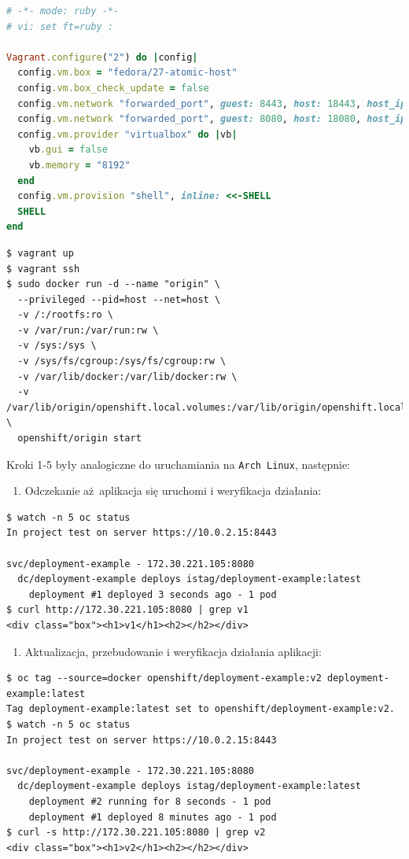 \documentclass[a4paper,12pt,twoside,openany]{report}
\providecommand{\tightlist}{%
  \setlength{\itemsep}{0pt}\setlength{\parskip}{0pt}}
\newcommand{\passthrough}[1]{#1}
\begin{document}
\begin{lstlisting}[language=Ruby]
# -*- mode: ruby -*-
# vi: set ft=ruby :

Vagrant.configure("2") do |config|
  config.vm.box = "fedora/27-atomic-host"
  config.vm.box_check_update = false
  config.vm.network "forwarded_port", guest: 8443, host: 18443, host_ip: "127.0.0.1"
  config.vm.network "forwarded_port", guest: 8080, host: 18080, host_ip: "127.0.0.1"
  config.vm.provider "virtualbox" do |vb|
    vb.gui = false
    vb.memory = "8192"
  end
  config.vm.provision "shell", inline: <<-SHELL
  SHELL
end
\end{lstlisting}

\begin{lstlisting}
$ vagrant up
$ vagrant ssh
$ sudo docker run -d --name "origin" \
  --privileged --pid=host --net=host \
  -v /:/rootfs:ro \
  -v /var/run:/var/run:rw \
  -v /sys:/sys \
  -v /sys/fs/cgroup:/sys/fs/cgroup:rw \
  -v /var/lib/docker:/var/lib/docker:rw \
  -v /var/lib/origin/openshift.local.volumes:/var/lib/origin/openshift.local.volumes:rslave \
  openshift/origin start
\end{lstlisting}

Kroki 1-5 były analogiczne do uruchamiania na
\passthrough{\lstinline!Arch Linux!}, następnie:

\begin{enumerate}
\def\labelenumi{\arabic{enumi}.}
\setcounter{enumi}{5}
\tightlist
\item
  Odczekanie aż~aplikacja się uruchomi i weryfikacja działania:
\end{enumerate}

\begin{lstlisting}
$ watch -n 5 oc status
In project test on server https://10.0.2.15:8443

svc/deployment-example - 172.30.221.105:8080
  dc/deployment-example deploys istag/deployment-example:latest 
    deployment #1 deployed 3 seconds ago - 1 pod
$ curl http://172.30.221.105:8080 | grep v1
<div class="box"><h1>v1</h1><h2></h2></div>
\end{lstlisting}

\begin{enumerate}
\def\labelenumi{\arabic{enumi}.}
\setcounter{enumi}{6}
\tightlist
\item
  Aktualizacja, przebudowanie i weryfikacja działania aplikacji:
\end{enumerate}

\begin{lstlisting}
$ oc tag --source=docker openshift/deployment-example:v2 deployment-example:latest
Tag deployment-example:latest set to openshift/deployment-example:v2.
$ watch -n 5 oc status
In project test on server https://10.0.2.15:8443

svc/deployment-example - 172.30.221.105:8080
  dc/deployment-example deploys istag/deployment-example:latest 
    deployment #2 running for 8 seconds - 1 pod
    deployment #1 deployed 8 minutes ago - 1 pod
$ curl -s http://172.30.221.105:8080 | grep v2
<div class="box"><h1>v2</h1><h2></h2></div>
\end{lstlisting}
\end{document}
